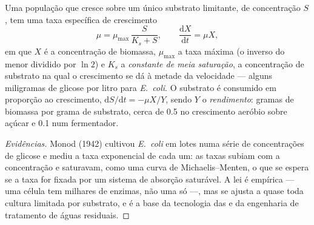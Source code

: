 \begin{theorem}\label{thm:b2:microbial-metabolism:monod}
Uma população que cresce sobre um único substrato limitante, de
concentração $S$, tem uma taxa específica de crescimento
\[
\mu = \mu_{\max}\,\frac{S}{K_s + S}, \qquad \frac{\mathrm{d}X}{\mathrm{d}t} = \mu X,
\]
em que $X$ é a concentração de biomassa, $\mu_{\max}$ a taxa máxima
(o inverso do menor  dividido por
$\ln 2$) e $K_s$ a \emph{constante de meia saturação}, a concentração
de substrato na qual o crescimento se dá à metade da velocidade ---
alguns miligramas de glicose por litro para \emph{E.~coli}. O
substrato é consumido em proporção ao crescimento,
$\mathrm{d}S/\mathrm{d}t =
-\mu X/Y$, sendo $Y$ o \emph{rendimento}: gramas de biomassa por grama
de substrato, cerca de \num{0.5} no crescimento aeróbio sobre açúcar e
\num{0.1} num fermentador.
\end{theorem}
\begin{proof}[Evidências]
Monod (1942) cultivou \emph{E.~coli} em lotes numa série de
concentrações de glicose e mediu a taxa exponencial de cada um: as
taxas subiam com a concentração e saturavam, como uma curva de
Michaelis--Menten, o que se espera se a taxa for fixada por um sistema
de absorção saturável. A lei é empírica --- uma célula tem milhares de
enzimas, não uma só ---, mas se ajusta a quase toda cultura limitada
por substrato, e é a base da tecnologia das  e da
engenharia de tratamento de águas residuais.
\end{proof}

